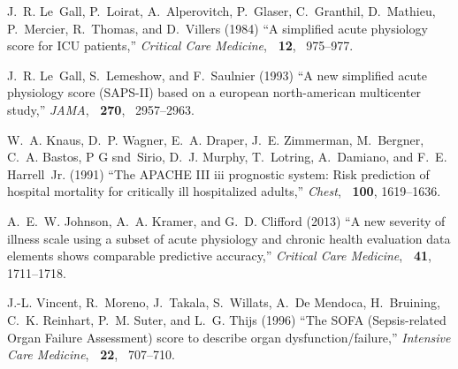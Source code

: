 \documentclass{bioinfo}
\begin{document}
%
%
%
%
%
%
%
%
%


\begin{thebibliography}{}

J.~R. Le~Gall, P.~Loirat, A.~Alperovitch, P.~Glaser, C.~Granthil, D.~Mathieu,
  P.~Mercier, R.~Thomas, and D.~Villers (1984) ``A simplified acute physiology score
  for {ICU} patients,'' {\it Critical Care Medicine}, {\bf ~12}, ~975--977.

J.~R. Le~Gall, S.~Lemeshow, and F.~Saulnier (1993) ``A new simplified acute physiology
  score ({SAPS-II}) based on a european north-american multicenter study,''
  {\em JAMA}, {\bf ~270}, ~2957--2963.
 
W.~A. Knaus, D.~P. Wagner, E.~A. Draper, J.~E. Zimmerman, M.~Bergner, C.~A.
  Bastos, P G snd~Sirio, D.~J. Murphy, T.~Lotring, A.~Damiano, and F.~E.
  Harrell~Jr. (1991) ``The {APACHE III} iii prognostic system: Risk prediction of
  hospital mortality for critically ill hospitalized adults,'' {\em Chest},
  {\bf ~100}, 1619--1636.
 
A.~E.~W. Johnson, A.~A. Kramer, and G.~D. Clifford (2013) ``A new severity of illness
  scale using a subset of acute physiology and chronic health evaluation data
  elements shows comparable predictive accuracy,'' {\em Critical Care
  Medicine}, {\bf ~41}, 1711--1718.
  
J.-L. Vincent, R.~Moreno, J.~Takala, S.~Willats, A.~{De Mendoca}, H.~Bruining,
  C.~K. Reinhart, P.~M. Suter, and L.~G. Thijs (1996) ``{The SOFA (Sepsis-related
  Organ Failure Assessment) score to describe organ dysfunction/failure},''
  {\em Intensive Care Medicine}, {\bf ~22}, ~707--710.






\end{thebibliography}
\end{document}
